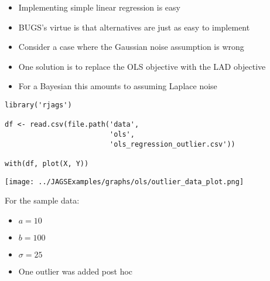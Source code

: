 \documentclass{beamer}
\begin{document}
\begin{frame}[fragile]
  \begin{itemize}
    \item{Implementing simple linear regression is easy}
    \item{BUGS's virtue is that alternatives are just as easy to implement}
  \end{itemize}
\end{frame}

\begin{frame}[fragile]
  \begin{itemize}
    \item{Consider a case where the Gaussian noise assumption is wrong}
    \item{One solution is to replace the OLS objective with the LAD objective}
    \item{For a Bayesian this amounts to assuming Laplace noise}
  \end{itemize}
\end{frame}

\begin{frame}[fragile]
  \begin{verbatim}
library('rjags')

df <- read.csv(file.path('data',
                         'ols',
                         'ols_regression_outlier.csv'))

with(df, plot(X, Y))
  \end{verbatim}
\end{frame}

\begin{frame}[fragile]
  \begin{center}
    \texttt{[image: ../JAGSExamples/graphs/ols/outlier\_data\_plot.png]}
  \end{center}
\end{frame}

\begin{frame}
  For the sample data:
  \begin{itemize}
    \item{$a = 10$}
    \item{$b = 100$}
    \item{$\sigma = 25$}
    \item{One outlier was added post hoc}
  \end{itemize}
\end{frame}
\end{document}
